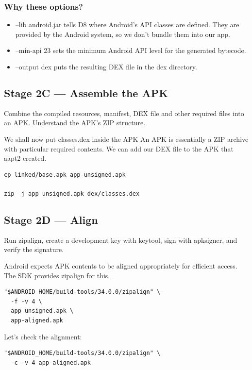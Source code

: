 \documentclass[11pt]{article}
\begin{document}
\subsubsection{Why these options?}
\label{sec:org41cc5c9}
\begin{itemize}
\item --lib android.jar tells D8 where Android's API classes are
defined. They are provided by the Android system, so we don't
bundle them into our app.
\item --min-api 23 sets the minimum Android API level for the generated bytecode.
\item --output dex puts the resulting DEX file in the dex directory.
\end{itemize}

\subsection{Stage 2C — Assemble the APK}
\label{sec:org27ad749}

Combine the compiled resources, manifest, DEX file and other
required files into an APK. Understand the APK's ZIP structure.  

We shall now put classes.dex inside the APK
An APK is essentially a ZIP archive with particular required
contents. We can add our DEX file to the APK that aapt2 created. 

\begin{verbatim}
cp linked/base.apk app-unsigned.apk

zip -j app-unsigned.apk dex/classes.dex
\end{verbatim}


\subsection{Stage 2D — Align}
\label{sec:org286de6c}

Run zipalign, create a development key with keytool, sign with
apksigner, and verify the signature. 

Android expects APK contents to be aligned appropriately for
efficient access. The SDK provides zipalign for this. 

\begin{verbatim}
"$ANDROID_HOME/build-tools/34.0.0/zipalign" \
  -f -v 4 \
  app-unsigned.apk \
  app-aligned.apk
\end{verbatim}

Let's check the alignment:

\begin{verbatim}
"$ANDROID_HOME/build-tools/34.0.0/zipalign" \
  -c -v 4 app-aligned.apk
\end{verbatim}
\end{document}
